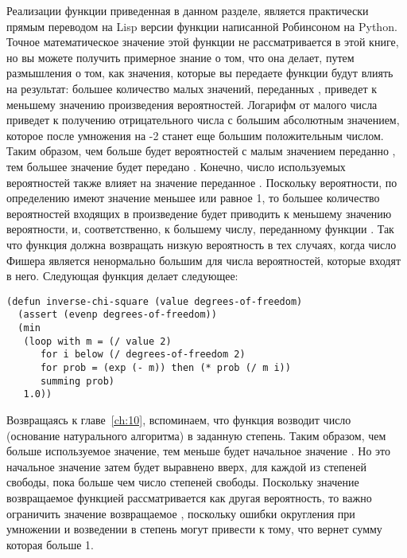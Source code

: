 Реализации функции  приведенная в данном разделе, является
практически прямым переводом на Lisp версии функции написанной Робинсоном на Python.
Точное математическое значение этой функции не рассматривается в этой книге, но вы можете
получить примерное знание о том, что она делает, путем размышления о том, как значения,
которые вы передаете функции  будут влиять на результат: большее количество
малых значений, переданных , приведет к меньшему значению произведения
вероятностей.  Логарифм от малого числа приведет к получению отрицательного числа с
большим абсолютным значением, которое после умножения на -2 станет еще большим
положительным числом.  Таким образом, чем больше будет вероятностей с малым значением
переданно , тем большее значение будет передано
. Конечно, число используемых вероятностей также влияет на
значение переданное .  Поскольку вероятности, по определению
имеют значение меньшее или равное 1, то большее количество вероятностей входящих в
произведение будет приводить к меньшему значению вероятности, и, соответственно, к
большему числу, переданному функции .  Так что функция
 должна возвращать низкую вероятность в тех случаях, когда число
Фишера является ненормально большим для числа вероятностей, которые входят в него.
Следующая функция делает следующее:

\begin{lstlisting}
(defun inverse-chi-square (value degrees-of-freedom)
  (assert (evenp degrees-of-freedom))
  (min 
   (loop with m = (/ value 2)
      for i below (/ degrees-of-freedom 2)
      for prob = (exp (- m)) then (* prob (/ m i))
      summing prob)
   1.0))
\end{lstlisting}

Возвращаясь к главе~\ref{ch:10}, вспоминаем, что функция  возводит число
 (основание натурального алгоритма) в заданную степень.  Таким образом, чем больше
используемое значение, тем меньше будет начальное значение .  Но это начальное
значение затем будет выравнено вверх, для каждой из степеней свободы, пока  больше
чем число степеней свободы.  Поскольку значение возвращаемое функцией
 рассматривается как другая вероятность, то важно ограничить
значение возвращаемое , поскольку ошибки округления при умножении и возведении в
степень могут привести к тому, что  вернет сумму которая больше 1.

